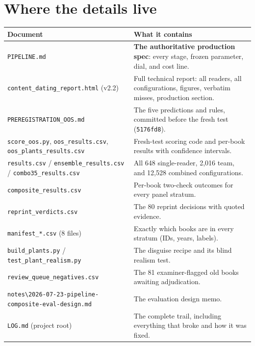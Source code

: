 \documentclass[11pt]{article}
\begin{document}
\section{Where the details live}\label{sec:docs}
\begin{small}
\begin{tabular}{@{}p{5.9cm}p{9.3cm}@{}}
\toprule
\textbf{Document} & \textbf{What it contains} \\
\midrule
\texttt{PIPELINE.md} & \textbf{The authoritative production spec}: every stage, frozen parameter, dial, and cost line. \\
\texttt{content\_dating\_report.html} (v2.2) & Full technical report: all readers, all configurations, figures, verbatim misses, production section. \\
\texttt{PREREGISTRATION\_OOS.md} & The five predictions and rules, committed before the fresh test (\texttt{5176fd8}). \\
\texttt{score\_oos.py}, \texttt{oos\_results.csv}, \texttt{oos\_plants\_results.csv} & Fresh-test scoring code and per-book results with confidence intervals. \\
\texttt{results.csv} / \texttt{ensemble\_results.csv} / \texttt{combo35\_results.csv} & All 648 single-reader, 2{,}016 team, and 12{,}528 combined configurations. \\
\texttt{composite\_results.csv} & Per-book two-check outcomes for every panel stratum. \\
\texttt{reprint\_verdicts.csv} & The 80 reprint decisions with quoted evidence. \\
\texttt{manifest\_*.csv} (8 files) & Exactly which books are in every stratum (IDs, years, labels). \\
\texttt{build\_plants.py} / \texttt{test\_plant\_realism.py} & The disguise recipe and its blind realism test. \\
\texttt{review\_queue\_negatives.csv} & The 81 examiner-flagged old books awaiting adjudication. \\
\texttt{notes\textbackslash 2026-07-23-pipeline-composite-eval-design.md} & The evaluation design memo. \\
\texttt{LOG.md} (project root) & The complete trail, including everything that broke and how it was fixed. \\
\bottomrule
\end{tabular}
\end{small}
\end{document}
